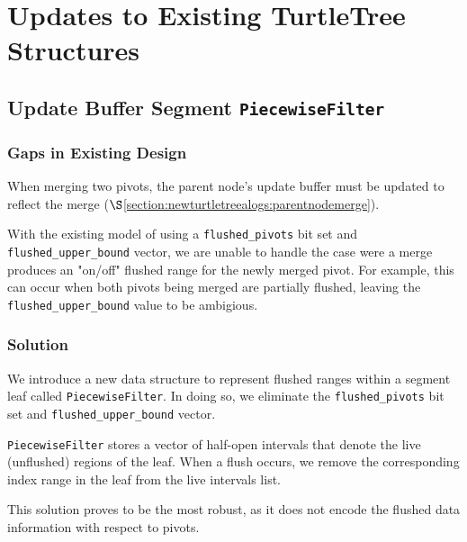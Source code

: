\documentclass[11pt]{article}
\begin{document}
\section{Updates to Existing TurtleTree Structures}

\subsection{Update Buffer Segment \texttt{PiecewiseFilter}}\label{section:datastructureupdates:piecewisefilter}
\subsubsection{Gaps in Existing Design}
When merging two pivots, the parent node's update buffer must be updated to reflect the merge ($\S$\ref{section:newturtletreealogs:parentnodemerge}).

With the existing model of using a \texttt{flushed\_pivots} bit set and \texttt{flushed\_upper\_bound} vector, we are unable to handle the case were a merge produces an "on/off" flushed range for the newly merged pivot. For example, this can occur when both pivots being merged are partially flushed, leaving the \texttt{flushed\_upper\_bound} value to be ambigious.

\subsubsection{Solution}
We introduce a new data structure to represent flushed ranges within a segment leaf called \texttt{PiecewiseFilter}. In doing so, we eliminate the \texttt{flushed\_pivots} bit set and \texttt{flushed\_upper\_bound} vector.

\texttt{PiecewiseFilter} stores a vector of half-open intervals that denote the live (unflushed) regions of the leaf. When a flush occurs, we remove the corresponding index range in the leaf from the live intervals list.

This solution proves to be the most robust, as it does not encode the flushed data information with respect to pivots.
\end{document}
